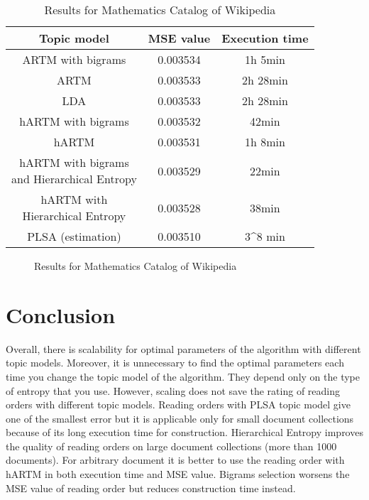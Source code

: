 \documentclass[12pt,twoside]{article}
\begin{document}
	\begin{table}[H]
	\centering
    \begin{tabular}{|c|c|c|}
    \hline
    Topic model & MSE value & Execution time\\
    \hline
    ARTM with bigrams & 0.003534 & 1h 5min \\
    ARTM & 0.003533 & 2h 28min \\
    LDA & 0.003533 & 2h 28min \\
    hARTM with bigrams & 0.003532 & 42min \\
    hARTM & 0.003531 & 1h 8min \\
    \specialcell{hARTM with bigrams \\ and Hierarchical Entropy} & 0.003529 & 22min \\
    \specialcell{hARTM with \\ Hierarchical Entropy} & 0.003528 & 38min \\
    PLSA (estimation) & 0.003510 & 3\cdot 10^8 min \\
    \hline
    \end{tabular}
    \caption{Results for Mathematics Catalog of Wikipedia}
	\end{table}
	
	\begin{figure}
    \centering
	\caption{Results for Mathematics Catalog of Wikipedia}
	\end{figure}
	
	\section{Conclusion}
	
	Overall, there is scalability for optimal parameters of the algorithm with different topic models. Moreover, it is unnecessary to find the optimal parameters each time you change the topic model of the algorithm. They depend only on the type of entropy that you use. However, scaling does not save the rating of reading orders with different topic models. Reading orders with PLSA topic model give one of the smallest error but it is applicable only for small document collections because of its long execution time for construction. Hierarchical Entropy improves the quality of reading orders on large document collections (more than 1000 documents). For arbitrary document it is better to use the reading order with hARTM in both execution time and MSE value. Bigrams selection worsens the MSE value of reading order but reduces construction time instead.
	
\end{document}
